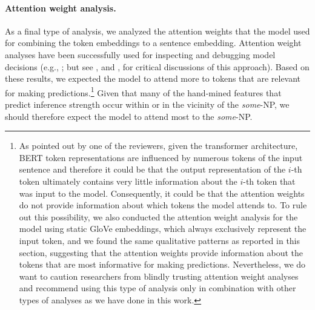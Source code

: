 \documentclass[11pt,a4paper]{article}
\begin{document}
\paragraph{Attention weight analysis.} As a final type of analysis, we analyzed the attention weights that the model used for combining the token embeddings to a sentence embedding. Attention weight analyses have been successfully used for inspecting and debugging model decisions (e.g., \citealp{lee2017interactive,ding2017visualizing,wiegreffe2019attention,vashishth2019attention}; but see \citealp{serrano2019attention}, and \citealp{jain2019attention}, for critical discussions of this approach). Based on these results, we expected the model to attend more to tokens that are relevant for making predictions.\footnote{As pointed out by one of the reviewers, given the transformer architecture,  BERT token representations are influenced by numerous tokens of the input sentence and therefore it could be that the output representation of the $i$-th token ultimately contains very little information about the  $i$-th token that was input to the model. Consequently, it could be that the attention weights do not provide information about which tokens the model attends to. To rule out this possibility, we also conducted the attention weight analysis for the model using static GloVe embeddings, which always exclusively represent the input token, and we found the same qualitative patterns as reported in this section, suggesting that the attention weights provide information about the tokens that are most informative for making predictions. Nevertheless, we do want to caution researchers from blindly trusting attention weight analyses and recommend using this type of analysis only in combination with other types of analyses as we have done in this work.} Given that many of the hand-mined features that predict inference strength occur within or in the vicinity of the \emph{some}-NP, we should therefore expect the model to attend most to the \emph{some}-NP. 
\end{document}
